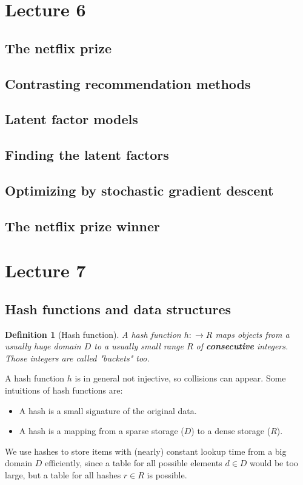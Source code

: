\documentclass[]{article}
\newtheorem{defi}{Definition}
\begin{document}
\section{Lecture 6}

\subsection{The netflix prize}

\subsection{Contrasting recommendation methods}

\subsection{Latent factor models}

\subsection{Finding the latent factors}

\subsection{Optimizing by stochastic gradient descent}

\subsection{The netflix prize winner}


\section{Lecture 7}

\subsection{Hash functions and data structures}
\begin{defi}[Hash function]
A hash function $h: \rightarrow R $ maps objects from a usually huge domain $D$ to a usually small range $R$ of \textbf{consecutive} integers. Those integers are called "buckets" too.
\end{defi}
A hash function $h$ is in general not injective, so collisions can appear. Some intuitions of hash functions are:
\begin{itemize}
\item A hash is a small signature of the original data.
\item A hash is a mapping from a sparse storage ($D$) to a dense storage  ($R$).
\end{itemize}
We use hashes to store items with (nearly) constant lookup time from a big domain $D$ efficiently, since a table for all possible elements $d \in D$ would be too large, but a table for all hashes $r \in R$ is possible.\\ \\
\end{document}
